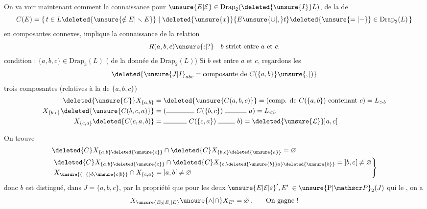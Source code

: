  On va voir maintenant comment la connaissance pour $\unsure{E|\mathcal E}\in\mathrm{Drap}_2(\deleted{\unsure{I}}L)$, de la  de
\[
 C(E)=\{\,t\in L\deleted{\unsure{\notin E|\smallsetminus E}}\mid
 \deleted{\unsure{x}}\{E\unsure{\cup|,}t\}\deleted{\unsure{=|-}}\in\mathrm{Drap}_3(L)\,\}
\]
en composantes connexes, implique la connaissance de la relation
\[
 R(a,b,c)\unsure{\mathord{:}|\mathord{?}}\quad b\text{ strict entre }a\text{ et }c.
\]
 condition : $\{a,b,c\}\in\mathrm{Drap}_3(L)$ ( de la donnée de $\mathrm{Drap}_2(L)$)
Si $b$ est entre $a$ et $c$, regardons les
\[
 \deleted{\unsure{J|I}_{abc}=\text{composante de }C(\{a,b\}}\unsure{,|)}
\]
trois composantes (relatives à la  de $\{a,b,c\}$)
\[
\begin{aligned}
\deleted{\unsure{C}}X_{\{a,b\}}&=\deleted{\unsure{C(a,b,c)}}=(\text{comp. de }C(\{a,b\})\text{ contenant }c)=L_{>b}\\
X_{\{b,c\}}\deleted{\unsure{C(b,c,a)}}&=(\rule{1.45cm}{.4pt}\ C(\{b,c\})\ \rule{1.1cm}{.4pt}\ a)=L_{<b}\\
X_{\{c,a\}}\deleted{C(c,a,b)}&=\rule{1.2cm}{.4pt}\ C(\{c,a\})\ \rule{.85cm}{.4pt}\ b)=\deleted{\unsure{\mathcal L}}\mathopen{]}a,c\mathclose{[}
\end{aligned}
\]

On trouve
\[
\begin{aligned}
&\deleted{C}X_{\{a,b\}\deleted{\unsure{c}}}\cap\deleted{C}X_{\{b,c\}\deleted{\unsure{a}}}=\varnothing\\
&\left.\begin{aligned}
&\deleted{C}X_{\{a,b\}\deleted{\unsure{c}}}\cap\deleted{C}X_{\{c,\deleted{\unsure{b}}a\}\deleted{\unsure{b}}}=\mathopen{]}b,c\mathclose{[}\ne\varnothing\\
&X_{\unsure{(\,|\,\{}b,\unsure{c|b}\}}\cap X_{\{c,a\}}=\mathopen{]}a,b\mathclose{[}\ne\varnothing
\end{aligned}\right\}
\end{aligned}
\]
donc $b$ est distingué, dans $J=\{a,b,c\}$, par la propriété que pour les deux  ${\unsure{E|\mathcal E|\varepsilon}}',E'$  $\in\unsure{\mathrm P|\mathscr P}_2(J)$ qui le , on a
\[
 X_{\unsure{E_{0}|E_{,}|E}}\unsure{\wedge|\cap}X_{E'}=\varnothing\,.\qquad\text{On gagne !}
\]

